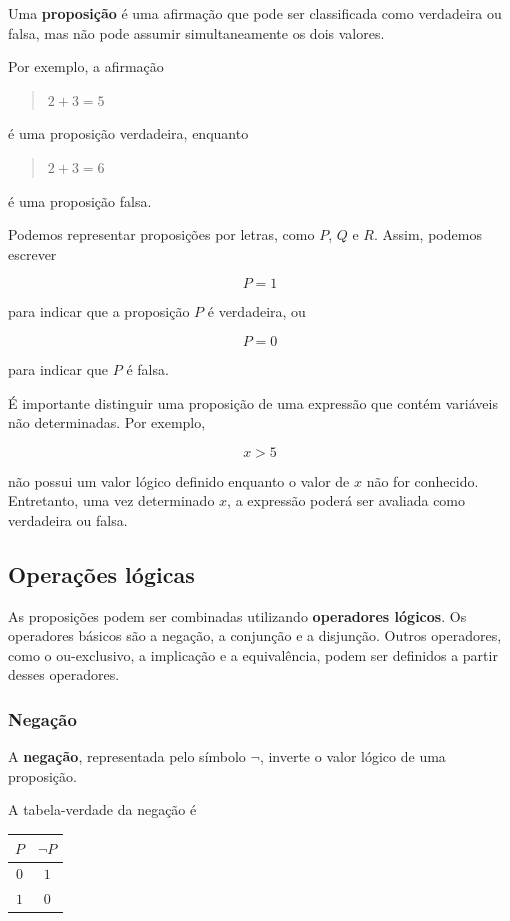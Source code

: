 \documentclass[
  brazilian,
  letterpaper,
]{book}
\theoremstyle{plain}
\theoremstyle{definition}
\theoremstyle{remark}
\begin{document}
Uma \textbf{proposição} é uma afirmação que pode ser classificada como
verdadeira ou falsa, mas não pode assumir simultaneamente os dois
valores.

Por exemplo, a afirmação

\begin{quote}
\(2+3=5\)
\end{quote}

é uma proposição verdadeira, enquanto

\begin{quote}
\(2+3=6\)
\end{quote}

é uma proposição falsa.

Podemos representar proposições por letras, como \(P\), \(Q\) e \(R\).
Assim, podemos escrever

\[
P=1
\]

para indicar que a proposição \(P\) é verdadeira, ou

\[
P=0
\]

para indicar que \(P\) é falsa.

É importante distinguir uma proposição de uma expressão que contém
variáveis não determinadas. Por exemplo,

\[
x>5
\]

não possui um valor lógico definido enquanto o valor de \(x\) não for
conhecido. Entretanto, uma vez determinado \(x\), a expressão poderá ser
avaliada como verdadeira ou falsa.

\subsection{Operações lógicas}\label{operauxe7uxf5es-luxf3gicas}

As proposições podem ser combinadas utilizando \textbf{operadores
lógicos}. Os operadores básicos são a negação, a conjunção e a
disjunção. Outros operadores, como o ou-exclusivo, a implicação e a
equivalência, podem ser definidos a partir desses operadores.

\subsubsection{Negação}\label{negauxe7uxe3o}

A \textbf{negação}, representada pelo símbolo \(\neg\), inverte o valor
lógico de uma proposição.

A tabela-verdade da negação é

\begin{longtable*}[]{|c|c|}
\toprule\noalign{}
\(P\) & \(\neg P\) \\
\midrule\noalign{}
\endhead
\bottomrule\noalign{}
\endlastfoot
\(0\) & \(1\) \\
\midrule
\(1\) & \(0\) \\
\end{longtable*}
\end{document}
